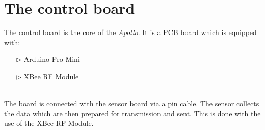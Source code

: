 \documentclass[12pt,a4paper,draft]{report}
\begin{document}
\section{The control board}
The control board is the core of the \emph{Apollo}. It is a PCB board which is equipped with:
\begin{itemize}
\item[$\triangleright$]Arduino Pro Mini
\item[$\triangleright$]XBee RF Module
\end{itemize}
% 
\ \\
%
The board is connected with the sensor board via a pin cable. 
The sensor collects the data which are then prepared for transmission and sent.
This is done with the use of the XBee RF Module.\\
%
\end{document}

